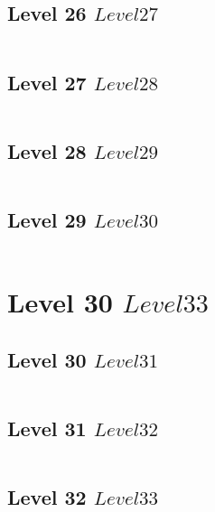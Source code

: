 \documentclass[a4paper]{report}
\begin{document}
\section{Level 26 \rightarrow $ Level 27 $}

\begin{verbatim}

\end{verbatim}


\section{Level 27 \rightarrow $ Level 28 $}

\begin{verbatim}

\end{verbatim}


\section{Level 28 \rightarrow $ Level 29 $}

\begin{verbatim}

\end{verbatim}


\section{Level 29 \rightarrow $ Level 30 $}

\begin{verbatim}

\end{verbatim}



\chapter{Level 30 \rightarrow $ Level 33 $}

\section{Level 30 \rightarrow $ Level 31 $}

\begin{verbatim}

\end{verbatim}


\section{Level 31 \rightarrow $ Level 32 $}

\begin{verbatim}

\end{verbatim}


\section{Level 32 \rightarrow $ Level 33 $}

\begin{verbatim}

\end{verbatim}
\end{document}
